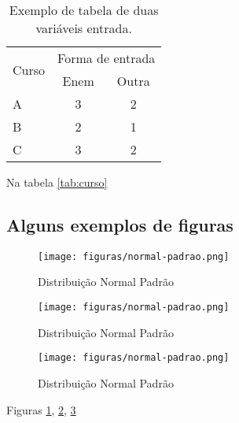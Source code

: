 \documentclass[a4paper, 11pt]{book}  %
\begin{document}
\begin{table}[H]
\centering
\caption{Exemplo de tabela de duas variáveis entrada.}
\label{tab:duas_entrdas}
\begin{tabular}{lc|c}
\hline
\multirow{2}{*}{Curso} & \multicolumn{2}{l}{Forma de entrada} \\ \cline{2-3} 
                       & Enem             & Outra             \\ \hline
A                      & 3                & 2                 \\
B                      & 2                & 1                 \\
C                      & 3                & 2                 \\ \hline            
\end{tabular}
\end{table}

Na tabela \ref{tab:curso}   %

\subsection{Alguns exemplos de figuras}

\begin{figure}[H]
    \centering
    \texttt{[image: figuras/normal-padrao.png]}
    \caption{Distribuição Normal Padrão}
    \label{fig:norma_padrão}
\end{figure}

\begin{figure}[H]
    \centering
    \texttt{[image: figuras/normal-padrao.png]}
    \caption{Distribuição Normal Padrão}
    \label{fig:norma_padrão_reduzida}
\end{figure}

\begin{figure}[H]
    \centering
    \texttt{[image: figuras/normal-padrao.png]}
    \caption{Distribuição Normal Padrão}
    \label{fig:normal-padrao-lagura-altura}
\end{figure}

Figuras \ref{fig:norma_padrão}, \ref{fig:norma_padrão_reduzida}, \ref{fig:normal-padrao-lagura-altura}
\end{document}
